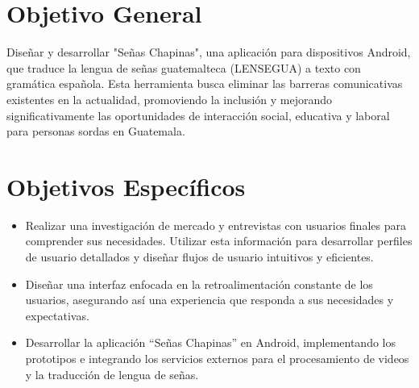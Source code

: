 \section{Objetivo General}
Diseñar y desarrollar "Señas Chapinas", una aplicación para dispositivos Android, que traduce la lengua de señas guatemalteca (LENSEGUA) a texto con gramática española. Esta herramienta busca eliminar las barreras comunicativas existentes en la actualidad, promoviendo la inclusión y mejorando significativamente las oportunidades de interacción social, educativa y laboral para personas sordas en Guatemala.

\section{Objetivos Específicos}
\begin{itemize}

\item Realizar una investigación de mercado y entrevistas con usuarios finales para comprender sus necesidades. Utilizar esta información para desarrollar perfiles de usuario detallados y diseñar flujos de usuario intuitivos y eficientes. 

\item Diseñar una interfaz enfocada en la retroalimentación constante de los usuarios, asegurando así una experiencia que responda a sus necesidades y expectativas. 

\item Desarrollar la aplicación ``Señas Chapinas'' en Android, implementando los prototipos e integrando los servicios externos para el procesamiento de videos y la traducción de lengua de señas.

\end{itemize}